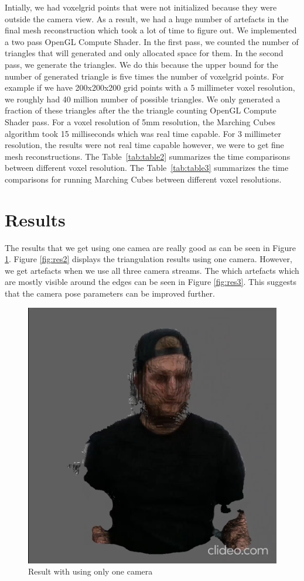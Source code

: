 \documentclass[10pt,twocolumn,letterpaper]{article}
\begin{document}
Intially, we had voxelgrid points that were not initialized because they were outside the camera view. As a result, we had a huge number of artefacts in the final mesh reconstruction which took a lot of time to figure out. We implemented a two pass OpenGL Compute Shader. In the first pass, we counted the number of triangles that will generated and only allocated space for them. In the second pass, we generate the triangles. We do this because the upper bound for the number of generated triangle is five times the number of voxelgrid points. For example if we have 200x200x200 grid points with a 5 millimeter voxel resolution, we roughly had 40 million number of possible triangles. We only generated a fraction of these triangles after the the triangle counting OpenGL Compute Shader pass. For a voxel resolution of 5mm resolution, the Marching Cubes algorithm took 15 milliseconds which was real time capable. For 3 millimeter resolution, the results were not real time capable however, we were to get fine mesh reconstructions.  The Table~\ref{tab:table2} summarizes the time comparisons between different voxel resolution. The Table~\ref{tab:table3} summarizes the time comparisons for running Marching Cubes between different voxel resolutions. 

\section{Results}
The results that we get using one camea are really good as can be seen in Figure \ref{fig:res1}. Figure \ref{fig:res2} displays the triangulation results using one camera. However, we get artefacts when we use all three camera streams. The which artefacts which are mostly visible around the edges can be seen in Figure \ref{fig:res3}. This suggests that the camera pose parameters can be improved further.

\begin{figure}[t]
\begin{center}
\includegraphics[width=0.65\linewidth]{imgs/res1}
\end{center}
 \caption{Result with using only one camera}
 \label{fig:res1}
\end{figure}
\end{document}
